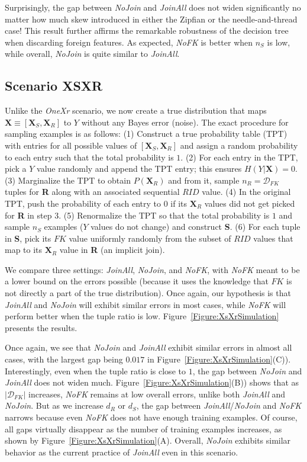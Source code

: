\documentclass{vldb}
\begin{document}
Surprisingly, the gap between \textit{NoJoin} and \textit{JoinAll} does not widen significantly no matter how much skew introduced in either the Zipfian or the 
needle-and-thread case! This result further affirms the remarkable robustness of the decision tree when discarding foreign features. As expected, 
\textit{NoFK} is better when $n_S$ is low, while overall, \textit{NoJoin} is quite similar to \textit{JoinAll}.


\subsection{Scenario XSXR}

Unlike the \textit{OneXr} scenario, we now create a true distribution that maps $\textbf{X} \equiv [\textbf{X}_S, \textbf{X}_R]$ to $Y$ without any Bayes error (noise).
The exact procedure for sampling examples is as follows: (1) Construct a true probability table (TPT) with entries for all possible values of 
$[\textbf{X}_S, \textbf{X}_R]$ and assign a random probability to each entry such that the total probability is $1$.
(2) For each entry in the TPT, pick a $Y$ value randomly and append the TPT entry; this ensures $H(Y|\textbf{X}) = 0$.
(3) Marginalize the TPT to obtain $P(\textbf{X}_R)$ and from it, sample $n_R = \mathcal{D}_{FK}$ tuples for \textbf{R} along with an associated sequential $RID$ value.
(4) In the original TPT, push the probability of each entry to $0$ if its $\textbf{X}_R$ values did not get picked for \textbf{R} in step 3.
(5) Renormalize the TPT so that the total probability is $1$ and sample $n_S$ examples ($Y$ values do not change) and construct \textbf{S}.
(6) For each tuple in \textbf{S}, pick its $FK$ value uniformly randomly from the subset of $RID$ values that map to its $\textbf{X}_R$ value in \textbf{R} (an implicit join).

We compare three settings: \textit{JoinAll}, \textit{NoJoin}, and \textit{NoFK}, with \textit{NoFK} meant to be a lower bound on the errors possible (because 
it uses the knowledge that $FK$ is not directly a part of the true distribution). Once again, our hypothesis is that \textit{JoinAll} and \textit{NoJoin} will exhibit similar 
errors in most cases, while \textit{NoFK} will perform better when the tuple ratio is low. Figure~\ref{Figure:XsXrSimulation} presents the results.

Once again, we see that \textit{NoJoin} and \textit{JoinAll} exhibit similar errors in almost all cases, with the largest gap being $0.017$ in Figure~\ref{Figure:XsXrSimulation}(C)).
Interestingly, even when the tuple ratio is close to $1$, the gap between \textit{NoJoin} and \textit{JoinAll} does not widen much. 
Figure~\ref{Figure:XsXrSimulation}(B)) shows that as $|\mathcal{D}_{FK}|$ increases, \textit{NoFK} remains at low overall errors, unlike both \textit{JoinAll} and \textit{NoJoin}.
But as we increase $d_R$ or $d_S$, the gap between \textit{JoinAll}/\textit{NoJoin} and \textit{NoFK} narrows because even \textit{NoFK} does not have enough training examples.
Of course, all gaps virtually disappear as the number of training examples increases, as shown by Figure~\ref{Figure:XsXrSimulation}(A).
Overall, \textit{NoJoin} exhibits similar behavior as the current practice of \textit{JoinAll} even in this scenario.
\end{document}
